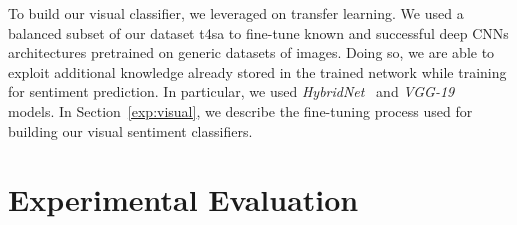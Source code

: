 To build our visual classifier, we leveraged on transfer learning. We used  a balanced subset of our dataset \gls{t4sa}
to {fine-tune} known and successful deep CNNs architectures pretrained on generic datasets of images. Doing so, we are able to exploit additional knowledge already stored in the trained network while training for sentiment prediction. In particular, we used \emph{HybridNet}~\cite{zhou2014learning} and \emph{VGG-19}~\cite{simonyan2014very} models.
In Section~\ref{exp:visual}, we describe the fine-tuning process used for building our visual sentiment classifiers.

\section{Experimental Evaluation}
\label{sec:vsa:experiments}
